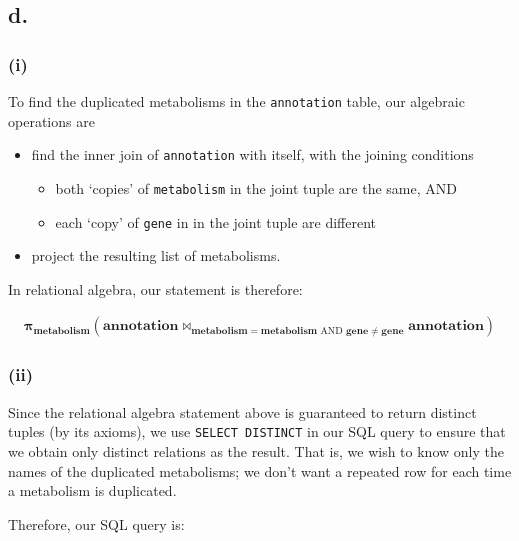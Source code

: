 \documentclass{article}
\begin{document}
\subsection{d.}

\subsubsection{(i)}

To find the duplicated metabolisms in the \texttt{annotation} table, our algebraic operations are
\begin{itemize}
    \item find the inner join of \texttt{annotation} with itself, with the joining conditions
    \begin{itemize}
        \item both `copies' of \texttt{metabolism} in the joint tuple are the same, AND
        \item each `copy' of \texttt{gene} in in the joint tuple are different
    \end{itemize}
    \item project the resulting list of metabolisms.
\end{itemize}

In relational algebra, our statement is therefore:

$$
\begin{aligned}
\boldsymbol{\pi}_\mathbf{metabolism}
\left(
    \mathbf{annotation} \bowtie_{\mathbf{metabolism} = \mathbf{metabolism} \text{ AND }
        \mathbf{gene} \ne \mathbf{gene}} \mathbf{annotation}
\right)
\end{aligned}
$$

\subsubsection{(ii)}

Since the relational algebra statement above is guaranteed to return distinct tuples (by its axioms), we use \texttt{SELECT DISTINCT} in our SQL query to ensure that we obtain only distinct relations as the result. That is, we wish to know only the names of the duplicated metabolisms; we don't want a repeated row for each time a metabolism is duplicated.

Therefore, our SQL query is:
\end{document}
